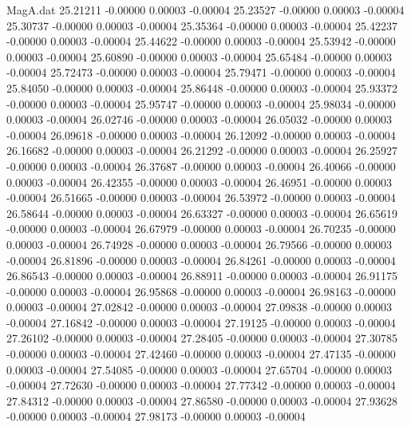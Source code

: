 \begin{filecontents}{MagA.dat}
  25.21211   -0.00000    0.00003   -0.00004
  25.23527   -0.00000    0.00003   -0.00004
  25.30737   -0.00000    0.00003   -0.00004
  25.35364   -0.00000    0.00003   -0.00004
  25.42237   -0.00000    0.00003   -0.00004
  25.44622   -0.00000    0.00003   -0.00004
  25.53942   -0.00000    0.00003   -0.00004
  25.60890   -0.00000    0.00003   -0.00004
  25.65484   -0.00000    0.00003   -0.00004
  25.72473   -0.00000    0.00003   -0.00004
  25.79471   -0.00000    0.00003   -0.00004
  25.84050   -0.00000    0.00003   -0.00004
  25.86448   -0.00000    0.00003   -0.00004
  25.93372   -0.00000    0.00003   -0.00004
  25.95747   -0.00000    0.00003   -0.00004
  25.98034   -0.00000    0.00003   -0.00004
  26.02746   -0.00000    0.00003   -0.00004
  26.05032   -0.00000    0.00003   -0.00004
  26.09618   -0.00000    0.00003   -0.00004
  26.12092   -0.00000    0.00003   -0.00004
  26.16682   -0.00000    0.00003   -0.00004
  26.21292   -0.00000    0.00003   -0.00004
  26.25927   -0.00000    0.00003   -0.00004
  26.37687   -0.00000    0.00003   -0.00004
  26.40066   -0.00000    0.00003   -0.00004
  26.42355   -0.00000    0.00003   -0.00004
  26.46951   -0.00000    0.00003   -0.00004
  26.51665   -0.00000    0.00003   -0.00004
  26.53972   -0.00000    0.00003   -0.00004
  26.58644   -0.00000    0.00003   -0.00004
  26.63327   -0.00000    0.00003   -0.00004
  26.65619   -0.00000    0.00003   -0.00004
  26.67979   -0.00000    0.00003   -0.00004
  26.70235   -0.00000    0.00003   -0.00004
  26.74928   -0.00000    0.00003   -0.00004
  26.79566   -0.00000    0.00003   -0.00004
  26.81896   -0.00000    0.00003   -0.00004
  26.84261   -0.00000    0.00003   -0.00004
  26.86543   -0.00000    0.00003   -0.00004
  26.88911   -0.00000    0.00003   -0.00004
  26.91175   -0.00000    0.00003   -0.00004
  26.95868   -0.00000    0.00003   -0.00004
  26.98163   -0.00000    0.00003   -0.00004
  27.02842   -0.00000    0.00003   -0.00004
  27.09838   -0.00000    0.00003   -0.00004
  27.16842   -0.00000    0.00003   -0.00004
  27.19125   -0.00000    0.00003   -0.00004
  27.26102   -0.00000    0.00003   -0.00004
  27.28405   -0.00000    0.00003   -0.00004
  27.30785   -0.00000    0.00003   -0.00004
  27.42460   -0.00000    0.00003   -0.00004
  27.47135   -0.00000    0.00003   -0.00004
  27.54085   -0.00000    0.00003   -0.00004
  27.65704   -0.00000    0.00003   -0.00004
  27.72630   -0.00000    0.00003   -0.00004
  27.77342   -0.00000    0.00003   -0.00004
  27.84312   -0.00000    0.00003   -0.00004
  27.86580   -0.00000    0.00003   -0.00004
  27.93628   -0.00000    0.00003   -0.00004
  27.98173   -0.00000    0.00003   -0.00004

\end{filecontents}
